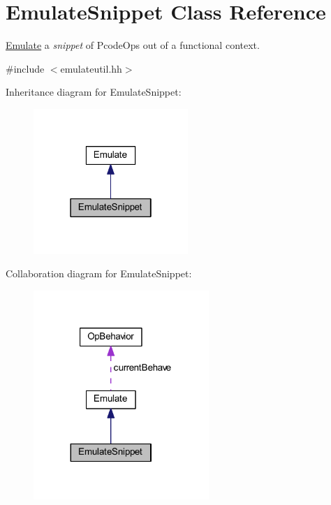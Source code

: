 \hypertarget{class_emulate_snippet}{}\section{Emulate\+Snippet Class Reference}
\label{class_emulate_snippet}


\mbox{\hyperlink{class_emulate}{Emulate}} a {\itshape snippet} of Pcode\+Ops out of a functional context.  




{\ttfamily \#include $<$emulateutil.\+hh$>$}



Inheritance diagram for Emulate\+Snippet\+:
\nopagebreak
\begin{figure}[H]
\begin{center}
\leavevmode
\includegraphics[width=166pt]{class_emulate_snippet__inherit__graph}
\end{center}
\end{figure}


Collaboration diagram for Emulate\+Snippet\+:
\nopagebreak
\begin{figure}[H]
\begin{center}
\leavevmode
\includegraphics[width=188pt]{class_emulate_snippet__coll__graph}
\end{center}
\end{figure}
